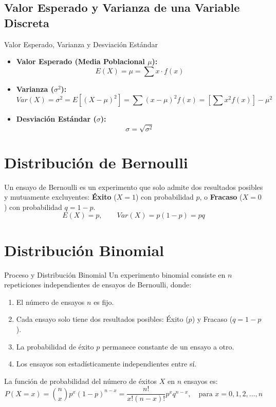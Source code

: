 \subsection{Valor Esperado y Varianza de una Variable Discreta}
\begin{definicion}{Valor Esperado, Varianza y Desviación Estándar}
\begin{itemize}
    \item \textbf{Valor Esperado (Media Poblacional $\mu$):}
    \begin{equation}
        E(X) = \mu = \sum x \cdot f(x)
    \end{equation}
    \item \textbf{Varianza ($\sigma^2$):}
    \begin{equation}
        Var(X) = \sigma^2 = E[(X - \mu)^2] = \sum (x - \mu)^2 f(x) = \left[ \sum x^2 f(x) \right] - \mu^2
    \end{equation}
    \item \textbf{Desviación Estándar ($\sigma$):}
    \begin{equation}
        \sigma = \sqrt{\sigma^2}
    \end{equation}
\end{itemize}
\end{definicion}

\section{Distribución de Bernoulli}
Un ensayo de Bernoulli es un experimento que solo admite dos resultados posibles y mutuamente excluyentes: \textbf{Éxito} ($X=1$) con probabilidad $p$, o \textbf{Fracaso} ($X=0$) con probabilidad $q = 1-p$.
\begin{equation}
    E(X) = p, \qquad Var(X) = p(1-p) = pq
\end{equation}

\section{Distribución Binomial}
\begin{definicion}{Proceso y Distribución Binomial}
Un experimento binomial consiste en $n$ repeticiones independientes de ensayos de Bernoulli, donde:
\begin{enumerate}
    \item El número de ensayos $n$ es fijo.
    \item Cada ensayo solo tiene dos resultados posibles: Éxito ($p$) y Fracaso ($q = 1-p$).
    \item La probabilidad de éxito $p$ permanece constante de un ensayo a otro.
    \item Los ensayos son estadísticamente independientes entre sí.
\end{enumerate}
La función de probabilidad del número de éxitos $X$ en $n$ ensayos es:
\begin{equation}
    P(X = x) = \binom{n}{x} p^x (1-p)^{n-x} = \frac{n!}{x!(n-x)!} p^x q^{n-x}, \quad \text{para } x = 0, 1, 2, \dots, n
\end{equation}
\end{definicion}

